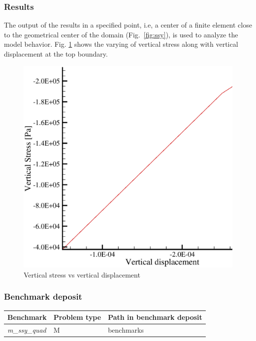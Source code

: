 \subsubsection*{Results}

The output of the results in a
specified point, i.e, a center of a finite element close to the
geometrical center of the domain (Fig.~\ref{fig:ssy}), is used to analyze the model behavior.
Fig. \ref{fig:ssy_u_s} shows the varying of vertical stress along with vertical displacement at the top boundary.

\begin{figure}[!htb]
\center
\includegraphics[scale=0.4]{M/ssy_u_s.eps}
\caption{Vertical stress vs vertical displacement}
 \label{fig:ssy_u_s}
\end{figure}

\subsubsection*{Benchmark deposit}

\begin{tabular}{|l|l|l|}
  \hline
  Benchmark & Problem type & Path in benchmark deposit \\
  \hline
 \emph{m\_ssy\_quad}& M & benchmarks\verb \M\ \\
  \hline
\end{tabular}
